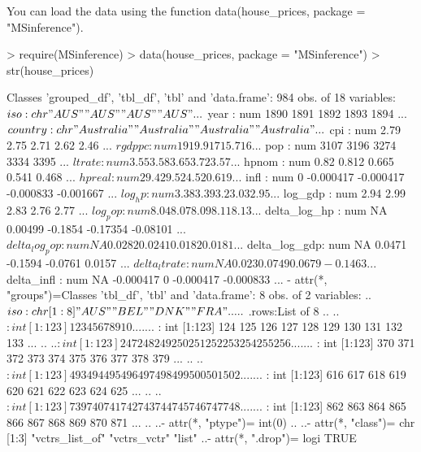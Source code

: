 \documentclass[a4paper]{article}
\begin{document}
You can load the data using the function data(house_prices, package = "MSinference").

\begin{Schunk}
\begin{Sinput}
> require(MSinference)
> data(house_prices, package = "MSinference")
> str(house_prices)
\end{Sinput}
\begin{Soutput}
Classes 'grouped_df', 'tbl_df', 'tbl' and 'data.frame':	984 obs. of  18 variables:
 $ iso          : chr  "AUS" "AUS" "AUS" "AUS" ...
 $ year         : num  1890 1891 1892 1893 1894 ...
 $ country      : chr  "Australia" "Australia" "Australia" "Australia" ...
 $ cpi          : num  2.79 2.75 2.71 2.62 2.46 ...
 $ rgdppc       : num  19 19.9 17 15.7 16 ...
 $ pop          : num  3107 3196 3274 3334 3395 ...
 $ ltrate       : num  3.55 3.58 3.65 3.72 3.57 ...
 $ hpnom        : num  0.82 0.812 0.665 0.541 0.468 ...
 $ hpreal       : num  29.4 29.5 24.5 20.6 19 ...
 $ infl         : num  0 -0.000417 -0.000417 -0.000833 -0.001667 ...
 $ log_hp       : num  3.38 3.39 3.2 3.03 2.95 ...
 $ log_gdp      : num  2.94 2.99 2.83 2.76 2.77 ...
 $ log_pop      : num  8.04 8.07 8.09 8.11 8.13 ...
 $ delta_log_hp : num  NA 0.00499 -0.1854 -0.17354 -0.08101 ...
 $ delta_log_pop: num  NA 0.0282 0.0241 0.0182 0.0181 ...
 $ delta_log_gdp: num  NA 0.0471 -0.1594 -0.0761 0.0157 ...
 $ delta_ltrate : num  NA 0.023 0.0749 0.0679 -0.1463 ...
 $ delta_infl   : num  NA -0.000417 0 -0.000417 -0.000833 ...
 - attr(*, "groups")=Classes 'tbl_df', 'tbl' and 'data.frame':	8 obs. of  2 variables:
  ..$ iso  : chr [1:8] "AUS" "BEL" "DNK" "FRA" ...
  ..$ .rows:List of 8
  .. ..$ : int [1:123] 1 2 3 4 5 6 7 8 9 10 ...
  .. ..$ : int [1:123] 124 125 126 127 128 129 130 131 132 133 ...
  .. ..$ : int [1:123] 247 248 249 250 251 252 253 254 255 256 ...
  .. ..$ : int [1:123] 370 371 372 373 374 375 376 377 378 379 ...
  .. ..$ : int [1:123] 493 494 495 496 497 498 499 500 501 502 ...
  .. ..$ : int [1:123] 616 617 618 619 620 621 622 623 624 625 ...
  .. ..$ : int [1:123] 739 740 741 742 743 744 745 746 747 748 ...
  .. ..$ : int [1:123] 862 863 864 865 866 867 868 869 870 871 ...
  .. ..- attr(*, "ptype")= int(0) 
  .. ..- attr(*, "class")= chr [1:3] "vctrs_list_of" "vctrs_vctr" "list"
  ..- attr(*, ".drop")= logi TRUE
\end{Soutput}
\end{Schunk}
\end{document}
